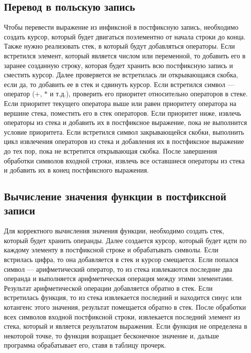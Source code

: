 \documentclass[12pt, a4paper]{article}
\begin{document}
\subsection{Перевод в польскую запись}
Чтобы перевести выражение из инфиксной в постфиксную запись, необходимо создать курсор, который будет двигаться поэлементно от начала строки до конца. Также нужно реализовать стек, в который будут добавляться операторы. Если встретился элемент, который является числом или переменной, то добавить его в заранее созданную строку, которая будет хранить всю постфиксную запись и сместить курсор. Далее проверяется не встретилась ли открывающаяся скобка, если да, то добавить ее в стек и сдвинуть курсор. Если встретился символ --- оператор ($+$, $*$ и т.д.), проверить его приоритет относительно операторов в стеке. Если приоритет текущего оператора выше или равен приоритету оператора на вершине стека, поместить его в стек операторов. Если приоритет ниже, извлечь операторы из стека и добавить их в постфиксное выражение, пока не выполнится условие приоритета. Если встретился символ закрывающейся скобки, выполнить цикл извлечения операторов из стека и добавления их в постфиксное выражение до тех пор, пока не встретится открывающая скобка. После завершения обработки символов входной строки, извлечь все оставшиеся операторы из стека и добавить их в конец постфиксного выражения.

\subsection{Вычисление значения функции в постфиксной записи}
Для корректного вычисления значения функции, необходимо создать стек, который будет хранить операнды. Далее создается курсор, который будет идти по каждому элементу в постфиксной строке и обрабатывать символы. Если встрилась цифра, то она добавляется в стек и курсор смещается. Если попался символ --- арифметический оператор, то из стека извлекаются последние два операнда и выполняется арифметическая операция между этими элементами. Результат арифметической операции добавляется обратно в стек. Если встретилась функция, то из стека извлекается последний и находится синус или котангенс этого значения, результат помещается обратно в стек. После обработки всех символов входной постфиксной строки, извлекается последний элемент из стека, который и является результатом выражения. Если функция не определена в некоторой точке, то функция возращает бесконечное значение и, дальше программа обрабатывает его, ставя в таблицу прочерк.
\end{document}

